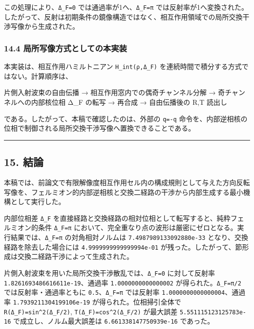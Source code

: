 \documentclass[
  a4paper,
]{article}
\newenvironment{Shaded}{}{}
\newcommand{\NormalTok}[1]{#1}
\begin{document}
この処理により、\texttt{Δ\_F=0} では通過率が1へ、\texttt{Δ\_F=π}
では反射率が1へ変換された。したがって、反射は初期条件の鏡像構造ではなく、相互作用領域での局所交換干渉写像から生成された。

\subsubsection{14.4
局所写像方式としての本実装}\label{ux5c40ux6240ux5199ux50cfux65b9ux5f0fux3068ux3057ux3066ux306eux672cux5b9fux88c5}

本実装は、相互作用ハミルトニアン \texttt{H\_int(ρ,Δ\_F)}
を連続時間で積分する方式ではない。計算順序は、

\begin{Shaded}
\begin{Highlighting}[]
\NormalTok{片側入射波束の自由伝播}
\NormalTok{→ 相互作用窓内での偶奇チャンネル分解}
\NormalTok{→ 奇チャンネルへの内部核位相 Δ\_F の転写}
\NormalTok{→ 再合成}
\NormalTok{→ 自由伝播後の R,T 読出し}
\end{Highlighting}
\end{Shaded}

である。したがって、本稿で確認したのは、外部の \texttt{q=-q}
命令を、内部逆相核の位相で制御される局所交換干渉写像へ置換できることである。

\begin{center}\rule{0.5\linewidth}{0.5pt}\end{center}

\subsection{15. 結論}\label{ux7d50ux8ad6}

本稿では、前論文で有限解像度相互作用セル内の構成規則として与えた方向反転写像を、フェルミオン的内部逆相核と交換二経路の干渉から内部生成する最小機構として実行した。

内部位相差 \texttt{Δ\_F}
を直接経路と交換経路の相対位相として転写すると、純粋フェルミオン的条件
\texttt{Δ\_F=π}
において、完全重なり点の波形は厳密にゼロとなる。実行結果では、\texttt{Δ\_F=π}
の対角相対ノルムは \texttt{7.4987989133092880e-33}
となり、交換経路を除去した場合には \texttt{4.9999999999999994e-01}
が残った。したがって、節形成は交換二経路干渉によって生成された。

片側入射波束を用いた局所交換干渉散乱では、\texttt{Δ\_F=0} に対して反射率
\texttt{1.8261693486616611e-19}、通過率 \texttt{1.0000000000000002}
が得られた。\texttt{Δ\_F=π/2} では反射率・通過率ともに
\texttt{0.5}、\texttt{Δ\_F=π} では反射率
\texttt{1.0000000000000004}、通過率 \texttt{1.7939211304199106e-19}
が得られた。位相掃引全体で \texttt{R(Δ\_F)=sin\^{}2(Δ\_F/2)},
\texttt{T(Δ\_F)=cos\^{}2(Δ\_F/2)} が最大誤差
\texttt{5.551115123125783e-16} で成立し、ノルム最大誤差は
\texttt{6.661338147750939e-16} であった。
\end{document}
